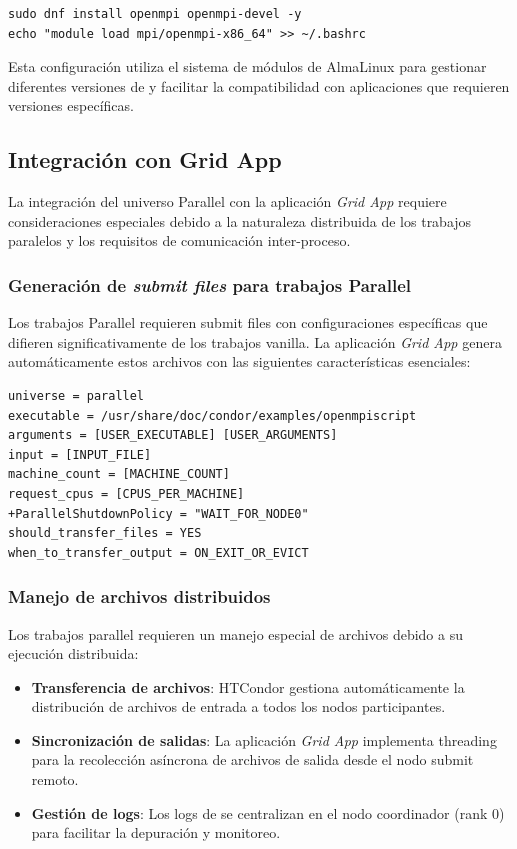 \begin{verbatim}
sudo dnf install openmpi openmpi-devel -y
echo "module load mpi/openmpi-x86_64" >> ~/.bashrc
\end{verbatim}

Esta configuración utiliza el sistema de módulos de AlmaLinux para gestionar diferentes versiones de \MPI y facilitar la compatibilidad con aplicaciones que requieren versiones específicas.

\subsection{Integración con Grid App}
\noindent

La integración del universo Parallel con la aplicación \textit{Grid App} requiere consideraciones especiales debido a la naturaleza distribuida de los trabajos paralelos y los requisitos de comunicación inter-proceso.

\subsubsection{Generación de \textit{submit files} para trabajos Parallel}
\noindent

Los trabajos Parallel requieren submit files con configuraciones específicas que difieren significativamente de los trabajos vanilla. La aplicación \textit{Grid App} genera automáticamente estos archivos con las siguientes características esenciales:

\begin{verbatim}
universe = parallel
executable = /usr/share/doc/condor/examples/openmpiscript
arguments = [USER_EXECUTABLE] [USER_ARGUMENTS]
input = [INPUT_FILE]
machine_count = [MACHINE_COUNT]
request_cpus = [CPUS_PER_MACHINE]
+ParallelShutdownPolicy = "WAIT_FOR_NODE0"
should_transfer_files = YES
when_to_transfer_output = ON_EXIT_OR_EVICT
\end{verbatim}

\subsubsection{Manejo de archivos distribuidos}
\noindent

Los trabajos parallel requieren un manejo especial de archivos debido a su ejecución distribuida:

\begin{itemize}
	\item \textbf{Transferencia de archivos}: HTCondor gestiona automáticamente la distribución de archivos de entrada a todos los nodos participantes.
	
	\item \textbf{Sincronización de salidas}: La aplicación \textit{Grid App} implementa threading para la recolección asíncrona de archivos de salida desde el nodo submit remoto.
	
	\item \textbf{Gestión de logs}: Los logs de \MPI se centralizan en el nodo coordinador (rank 0) para facilitar la depuración y monitoreo.
\end{itemize}

